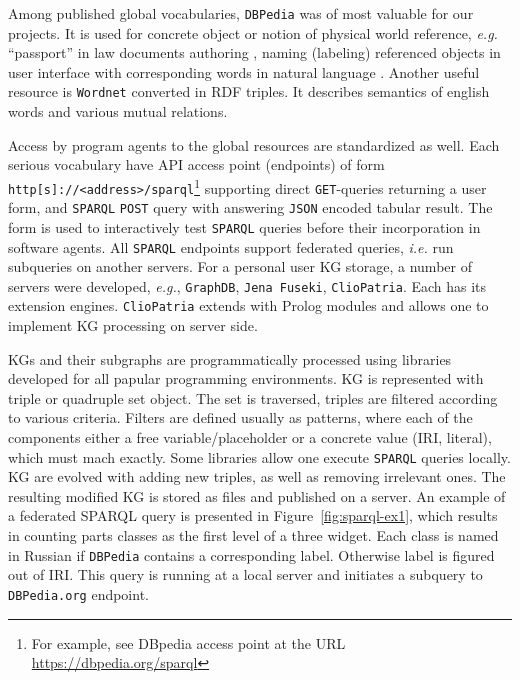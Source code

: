 \documentclass[
]{ceurart}
\begin{document}
Among published global vocabularies, \texttt{DBPedia} was of most valuable for our projects.  It is used for concrete object or notion of physical world reference, \emph{e.g.} ``passport'' in law documents authoring \cite{}, naming (labeling) referenced objects in user interface with corresponding words in natural language \cite{github-db}.  Another useful resource is \texttt{Wordnet} converted in RDF triples.  It describes semantics of english words and various mutual relations.

Access by program agents to the global resources are standardized as well.  Each serious vocabulary have API access point (endpoints) of form
\verb|http[s]://<address>/sparql|\footnote{For example, see DBpedia access point at the URL \url{https://dbpedia.org/sparql}} supporting direct \texttt{GET}-queries returning a user form, and \texttt{SPARQL} \texttt{POST} query with answering \texttt{JSON} encoded tabular result.  The form is used to interactively test \texttt{SPARQL} queries before their incorporation in software agents.  All \texttt{SPARQL} endpoints support federated queries, \emph{i.e.} run subqueries on another servers.   For a personal user KG storage, a number of servers were developed, \emph{e.g.}, \texttt{GraphDB}, \texttt{Jena Fuseki}, \texttt{ClioPatria}.  Each has its extension engines.  \texttt{ClioPatria} extends with Prolog modules and allows one to implement KG processing on server side.

KGs and their subgraphs are programmatically processed using libraries developed for all papular programming environments.  KG is represented with triple or quadruple set object.  The set is traversed, triples are filtered according to various criteria.  Filters are defined usually as patterns, where each of the components either a free variable/placeholder or a concrete value (IRI, literal), which must mach exactly.   Some libraries allow one execute \texttt{SPARQL} queries locally.  KG are evolved with adding new triples, as well as removing irrelevant ones.  The resulting modified KG is stored as files and published on a server.  An example of a federated SPARQL query is presented in Figure~\ref{fig:sparql-ex1}, which results in counting parts classes as the first level of a three widget.  Each class is named in Russian if \texttt{DBPedia} contains a corresponding label.  Otherwise label is figured out of IRI.  This query is running at a local server and initiates a subquery to \texttt{DBPedia.org} endpoint.
\end{document}
